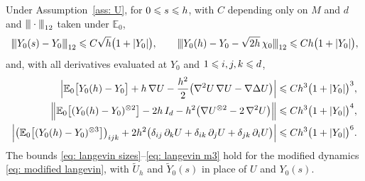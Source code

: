 \begin{lemma}
\label{lem: langevin moments}
    Under Assumption~\ref{ass: U}, for $0 \leqslant s \leqslant h$, with $C$ depending only on $M$ and $d$ and ${\vert\kern-0.25ex\vert\kern-0.25ex\vert} \cdot {\vert\kern-0.25ex\vert\kern-0.25ex\vert}_{12}$ taken under $\mathbb E_0$,
    \begin{equation}
        {\vert\kern-0.25ex\vert\kern-0.25ex\vert} Y_0(s) - Y_0 {\vert\kern-0.25ex\vert\kern-0.25ex\vert}_{12} \leqslant C \sqrt h \bigl( 1 + |Y_0| \bigr) , \qquad
        {\vert\kern-0.25ex\vert\kern-0.25ex\vert} Y_0(h) - Y_0 - \sqrt{2h}\, \chi_0 {\vert\kern-0.25ex\vert\kern-0.25ex\vert}_{12} \leqslant C h \bigl( 1 + |Y_0| \bigr) ,
        \label{eq: langevin sizes}
    \end{equation}
    and, with all derivatives evaluated at $Y_0$ and $1 \leqslant i,j,k \leqslant d$,
    \begin{align}
        \Bigl| \mathbb E_0\bigl[ Y_0(h) - Y_0 \bigr] + h\, \nabla U - \frac{h^2}{2} \bigl( \nabla^2 U\, \nabla U - \nabla \Delta U \bigr) \Bigr| &\leqslant C h^3 \bigl( 1+|Y_0| \bigr)^3 , \label{eq: langevin m1}\\
        \Bigl\| \mathbb E_0\bigl[ (Y_0(h) - Y_0)^{\otimes 2} \bigr] - 2h\, I_d - h^2 \bigl( \nabla U^{\otimes 2} - 2\, \nabla^2 U \bigr) \Bigr\| &\leqslant C h^3 \bigl( 1+|Y_0| \bigr)^4 , \label{eq: langevin m2}\\
        \Bigl| \bigl( \mathbb E_0\bigl[ (Y_0(h) - Y_0)^{\otimes 3} \bigr] \bigr)_{ijk} + 2h^2 \bigl( \delta_{ij}\, \partial_k U + \delta_{ik}\, \partial_j U + \delta_{jk}\, \partial_i U \bigr) \Bigr| &\leqslant C h^3 \bigl( 1+|Y_0| \bigr)^{6} . \label{eq: langevin m3}
    \end{align}
    The bounds \eqref{eq: langevin sizes}--\eqref{eq: langevin m3} hold for the modified dynamics \eqref{eq: modified langevin}, with $\tilde U_h$ and $\tilde Y_0(s)$ in place of $U$ and $Y_0(s)$.
\end{lemma}

